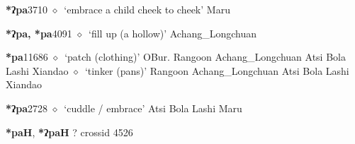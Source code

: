   \begin{list}{}{\leftmargin=1.5em \itemindent=-1.5em}
  \item {\footnotesize \textbf{*ʔpa}}{\tiny 3710}
         $\diamond$~`embrace a child cheek to cheek'
         Maru 
  \item {\footnotesize \textbf{*ʔpa, *pa}}{\tiny 4091}
\hspace{1ex}
         $\diamond$~`fill up (a hollow)'
         Achang\_Longchuan 
  \item {\footnotesize \textbf{*pa}}{\tiny 11686}
\hspace{1ex}
         $\diamond$~`patch (clothing)'
         OBur. 
\hspace{1ex}
         Rangoon 
\hspace{1ex}
         Achang\_Longchuan 
\hspace{1ex}
         Atsi 
\hspace{1ex}
         Bola 
\hspace{1ex}
         Lashi 
\hspace{1ex}
         Xiandao 
\hspace{1ex}
         $\diamond$~`tinker (pans)'
         Rangoon 
\hspace{1ex}
         Achang\_Longchuan 
\hspace{1ex}
         Atsi 
\hspace{1ex}
         Bola 
\hspace{1ex}
         Lashi 
\hspace{1ex}
         Xiandao 
  \item {\footnotesize \textbf{*ʔpa}}{\tiny 2728}
\hspace{1ex}
         $\diamond$~`cuddle / embrace'
         Atsi 
\hspace{1ex}
         Bola 
\hspace{1ex}
         Lashi 
\hspace{1ex}
         Maru 
  \end{list}
\item
\textbf{*paH}, \textbf{*ʔpaH}
?
  {\tiny crossid 4526}
